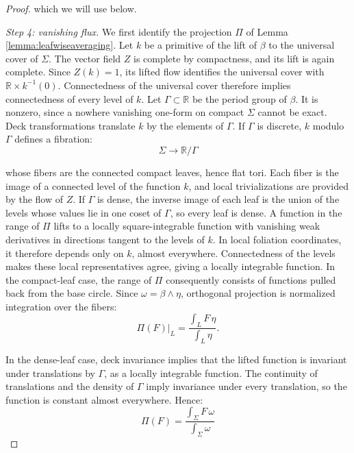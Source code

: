 \documentclass[10pt,reqno,a4paper]{amsart}
\theoremstyle{plain}
\theoremstyle{definition}
\theoremstyle{remark}
\theoremstyle{remark}
\renewcommand{\(}{ (}
\renewcommand{\)}{ )}
\begin{document}
\begin{proof}
\noindent
which we will use below.

\medskip
\noindent
\emph{Step 4: vanishing flux.}
We first identify the projection $\Pi$ of Lemma \ref{lemma:leafwiseaveraging}. Let $k$ be a primitive of the lift of $\beta$ to the universal cover of $\Sigma$. The vector field $Z$ is complete by compactness, and its lift is again complete. Since $Z(k)=1$, its lifted flow identifies the universal cover with $\mathbb{R}\times k^{-1}(0)$. Connectedness of the universal cover therefore implies connectedness of every level of $k$. Let $\Gamma\subset\mathbb{R}$ be the period group of $\beta$. It is nonzero, since a nowhere vanishing one-form on compact $\Sigma$ cannot be exact. Deck transformations translate $k$ by the elements of $\Gamma$. If $\Gamma$ is discrete, $k$ modulo $\Gamma$ defines a fibration:
\begin{equation*}
\Sigma\longrightarrow\mathbb{R}/\Gamma
\end{equation*}
	
\noindent
whose fibers are the connected compact leaves, hence flat tori. Each fiber is the image of a connected level of the function $k$, and local trivializations are provided by the flow of $Z$. If $\Gamma$ is dense, the inverse image of each leaf is the union of the levels whose values lie in one coset of $\Gamma$, so every leaf is dense. A function in the range of $\Pi$ lifts to a locally square-integrable function with vanishing weak derivatives in directions tangent to the levels of $k$. In local foliation coordinates, it therefore depends only on $k$, almost everywhere. Connectedness of the levels makes these local representatives agree, giving a locally integrable function. In the compact-leaf case, the range of $\Pi$ consequently consists of functions pulled back from the base circle. Since $\omega=\beta\wedge\eta$, orthogonal projection is normalized integration over the fibers:
\begin{equation*}
\Pi(F)\vert_L = \frac{\int_L F\,\eta}{\int_L\eta}.
\end{equation*}
	
\noindent
In the dense-leaf case, deck invariance implies that the lifted function is invariant under translations by $\Gamma$, as a locally integrable function. The continuity of translations and the density of $\Gamma$ imply invariance under every translation, so the function is constant almost everywhere. Hence:
\begin{equation*}
\Pi(F) = \frac{\int_{\Sigma}F\,\omega}{\int_{\Sigma}\omega}
\end{equation*}
	

\end{proof}
\end{document}
